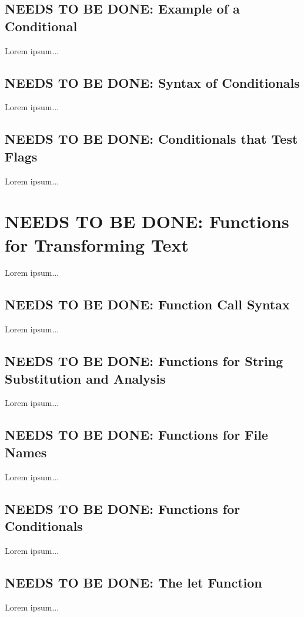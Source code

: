 \documentclass{charun}
\begin{document}
\begin{multicols*}{2}
\color{gray}
\subsection{NEEDS TO BE DONE: Example of a Conditional}
Lorem ipsum...
\color{black}

\color{gray}
\subsection{NEEDS TO BE DONE: Syntax of Conditionals}
Lorem ipsum...
\color{black}

\color{gray}
\subsection{NEEDS TO BE DONE: Conditionals that Test Flags}
Lorem ipsum...
\color{black}


\color{gray}
\section{NEEDS TO BE DONE: Functions for Transforming Text}
Lorem ipsum...
\color{black}


\color{gray}
\subsection{NEEDS TO BE DONE: Function Call Syntax}
Lorem ipsum...
\color{black}

\color{gray}
\subsection{NEEDS TO BE DONE: Functions for String Substitution and Analysis}
Lorem ipsum...
\color{black}

\color{gray}
\subsection{NEEDS TO BE DONE: Functions for File Names}
Lorem ipsum...
\color{black}

\color{gray}
\subsection{NEEDS TO BE DONE: Functions for Conditionals}
Lorem ipsum...
\color{black}

\color{gray}
\subsection{NEEDS TO BE DONE: The let Function}
Lorem ipsum...
\color{black}


\end{multicols*}
\end{document}
